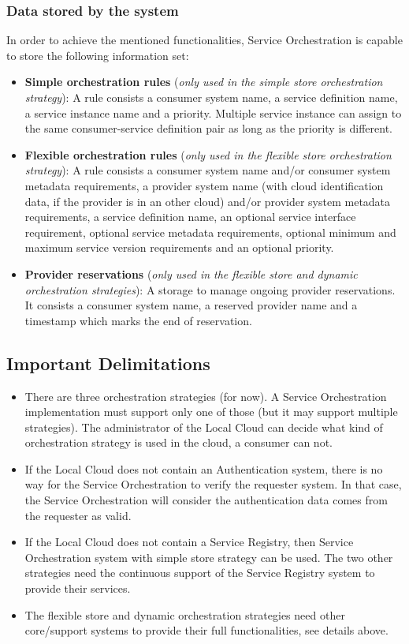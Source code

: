 \documentclass[a4paper]{arrowhead}
\begin{document}
\subsubsection {Data stored by the system}
In order to achieve the mentioned functionalities, Service Orchestration is capable to store the following information set:

\begin{itemize}
    \item \textbf{Simple orchestration rules} (\textit{only used in the simple store orchestration strategy}): A rule consists a consumer system name, a service definition name, a service instance name and a priority. Multiple service instance can assign to the same consumer-service definition pair as long as the priority is different.
    \item \textbf{Flexible orchestration rules} (\textit{only used in the flexible store orchestration strategy}): A rule consists a consumer system name and/or consumer system metadata requirements, a provider system name (with cloud identification data, if the provider is in an other cloud) and/or provider system metadata requirements, a service definition name, an optional service interface requirement, optional service metadata requirements, optional minimum and maximum service version requirements and an optional priority.
    \item \textbf{Provider reservations} (\textit{only used in the flexible store and dynamic orchestration strategies}): A storage to manage ongoing provider reservations. It consists a consumer system name, a reserved provider name and a timestamp which marks the end of reservation.
\end{itemize}

\subsection{Important Delimitations}
\label{sec:delimitations}

\begin{itemize}
    \item There are three orchestration strategies (for now). A Service Orchestration implementation must support only one of those (but it may support multiple strategies). The administrator of the Local Cloud can decide what kind of orchestration strategy is used in the cloud, a consumer can not.
    \item If the Local Cloud does not contain an Authentication system, there is no way for the Service Orchestration to verify the requester system. In that case, the Service Orchestration will consider the authentication data comes from the requester as valid.
    \item If the Local Cloud does not contain a Service Registry, then Service Orchestration system with simple store strategy can be used. The two other strategies need the continuous support of the Service Registry system to provide their services.
    \item The flexible store and dynamic orchestration strategies need other core/support systems to provide their full functionalities, see details above.
\end{itemize} 
\end{document}
